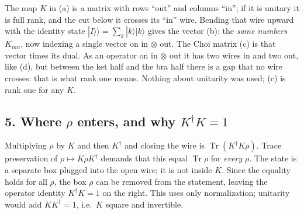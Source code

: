\documentclass[11pt]{article}
\newcommand{\obox}[5]{\draw[thick,rounded corners=2pt,fill=black!8] (#1,#2) rectangle (#3,#4);\node at ({(#1+#3)/2},{(#2+#4)/2}) {#5};}
\newcommand{\kk}[1]{|#1\rangle\!\rangle}
\begin{document}
The map $K$ in (a) is a matrix with rows ``out'' and columns ``in''; if it is unitary it is full
rank, and the cut below it crosses its ``in'' wire. Bending that wire upward with the identity state
$\kk{I}=\sum_k|k\rangle|k\rangle$ gives the vector (b): the \emph{same numbers} $K_{mn}$, now
indexing a single vector on in$\,\otimes\,$out. The Choi matrix (c) is that vector times its dual.
As an operator on in$\,\otimes\,$out it has two wires in and two out, like (d), but between the ket
half and the bra half there is a gap that no wire crosses: that is what rank one means. Nothing about
unitarity was used; (c) is rank one for any $K$.

\subsection*{5. Where $\rho$ enters, and why $K^\dagger K=1$}
\begin{center}
\end{center}
Multiplying $\rho$ by $K$ and then $K^\dagger$ and closing the wire is $\operatorname{Tr}(K^\dagger K\rho)$.
Trace preservation of $\rho\mapsto K\rho K^\dagger$ demands that this equal $\operatorname{Tr}\rho$ for
\emph{every} $\rho$. The state is a separate box plugged into the open wire; it is not inside $K$. Since
the equality holds for all $\rho$, the box $\rho$ can be removed from the statement, leaving the operator
identity $K^\dagger K=1$ on the right. This uses only normalization; unitarity would add $KK^\dagger=1$,
i.e.\ $K$ square and invertible.
\end{document}
